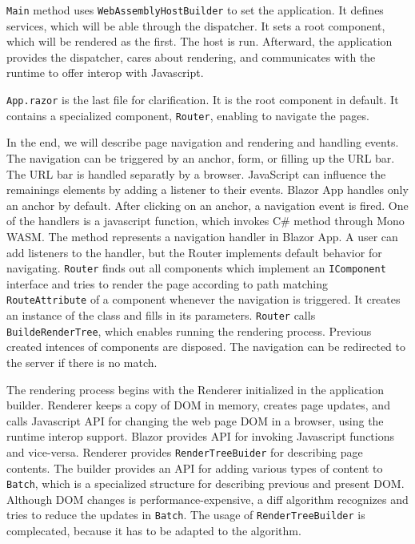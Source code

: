 \par
\texttt{Main} method uses \texttt{WebAssemblyHostBuilder} to set the application.
It defines services, which will be able through the dispatcher.
It sets a root component, which will be rendered as the first.
The host is run.
Afterward, the application provides the dispatcher, cares about rendering, and communicates with the runtime to offer interop with Javascript.
\par
\texttt{App.razor} is the last file for clarification.
It is the root component in default.
It contains a specialized component, \texttt{Router}, enabling to navigate the pages.
\par
In the end, we will describe page navigation and rendering and handling events.
The navigation  can be triggered by an anchor, form, or filling up the URL bar.
The URL bar is handled separatly by a browser.
JavaScript can influence the remainings elements by adding a listener to their events.
Blazor App handles only an anchor by default.
After clicking on an anchor, a navigation event is fired.
One of the handlers is a javascript function, which invokes C\# method through Mono WASM. 
The method represents a navigation handler in Blazor App.
A user can add listeners to the handler, but the Router implements default behavior for navigating.
\texttt{Router} finds out all components which implement an \texttt{IComponent} interface and tries to render the page according to path matching \texttt{RouteAttribute} of a component whenever the navigation is triggered.
It creates an instance of the class and fills in its parameters.
\texttt{Router} calls \texttt{BuildeRenderTree}, which enables running the rendering process.
Previous created intences of components are disposed.
The navigation can be redirected to the server if there is no match.
\par
The rendering process begins with the Renderer initialized in the application builder.
Renderer keeps a copy of DOM in memory, creates page updates, and calls Javascript API for changing the web page DOM in a browser, using the runtime interop support.
Blazor provides API for invoking Javascript functions and vice-versa.
Renderer provides \texttt{RenderTreeBuider} for describing page contents.
The builder provides an API for adding various types of content to \texttt{Batch}, which is a specialized structure for describing previous and present DOM.
Although DOM changes is performance-expensive, a diff algorithm recognizes and tries to reduce the updates in \texttt{Batch}.
The usage of \texttt{RenderTreeBuilder} is complecated, because it has to be adapted to the algorithm.
